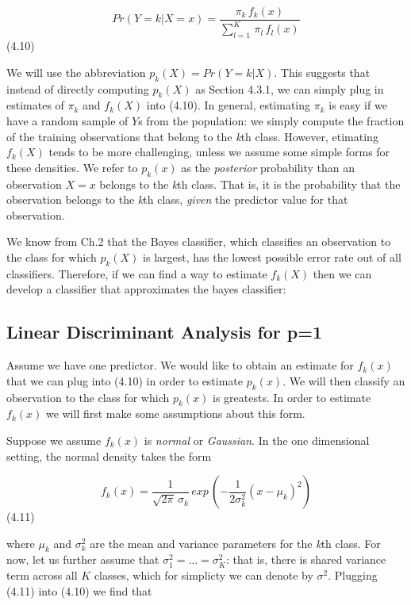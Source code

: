 \documentclass[
  letterpaper,
  DIV=11,
  numbers=noendperiod]{scrreprt}
\begin{document}
{\[
Pr(Y = k | X = x) = \frac{
\pi_k\,f_k(x)
}
{
\sum^K_{l = 1}\,\pi_l\,f_l(x)
}
\] (4.10)

We will use the abbreviation \(p_k(X) = Pr(Y = k | X)\). This suggests
that instead of directly computing \(p_k(X)\) as Section 4.3.1, we can
simply plug in estimates of \(\pi_k\) and \(f_k(X)\) into (4.10). In
general, estimating \(\pi_k\) is easy if we have a random sample of
\(Y\)s from the population: we simply compute the fraction of the
training observations that belong to the \emph{k}th class. However,
etimating \(f_k(X)\) tends to be more challenging, unless we assume some
simple forms for these densities. We refer to \(p_k(x)\) as the
\emph{posterior} probability than an observation \(X=x\) belongs to the
\emph{k}th class. That is, it is the probability that the observation
belongs to the \emph{k}th class, \emph{given} the predictor value for
that observation.

We know from Ch.2 that the Bayes classifier, which classifies an
observation to the class for which \(p_k(X)\) is largest, has the lowest
possible error rate out of all classifiers. Therefore, if we can find a
way to estimate \(f_k(X)\) then we can develop a classifier that
approximates the bayes classifier:

\hypertarget{linear-discriminant-analysis-for-p1}{%
\subsection{Linear Discriminant Analysis for
p=1}\label{linear-discriminant-analysis-for-p1}}

Assume we have one predictor. We would like to obtain an estimate for
\(f_k(x)\) that we can plug into (4.10) in order to estimate \(p_k(x)\).
We will then classify an observation to the class for which \(p_k(x)\)
is greatests. In order to estimate \(f_k(x)\) we will first make some
assumptions about this form.

Suppose we assume \(f_k(x)\) is \emph{normal} or \emph{Gaussian}. In the
one dimensional setting, the normal density takes the form

\[
f_k(x) = \frac{
1
}
{
\sqrt{2\pi}\,\sigma_k
}\,exp\,\left(-\frac{1}{2\sigma^2_k}(x - \mu_k)^2\right)
\] (4.11)

where \(\mu_k\) and \(\sigma^2_k\) are the mean and variance parameters
for the \emph{k}th class. For now, let us further assume that
\(\sigma_1^2=\dots=\sigma^2_K\): that is, there is shared variance term
across all \(K\) classes, which for simplicty we can denote by
\(\sigma^2\). Plugging (4.11) into (4.10) we find that

}
\end{document}
